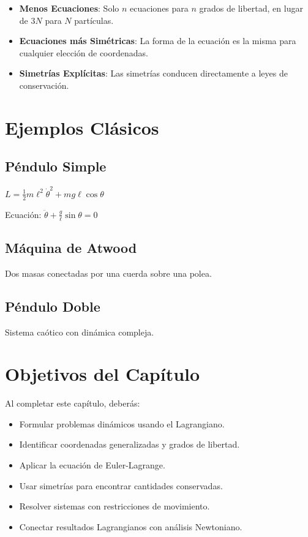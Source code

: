 \begin{itemize}
    \item \textbf{Menos Ecuaciones}: Solo $n$ ecuaciones para $n$ grados de libertad, en lugar de $3N$ para $N$ partículas.
    \item \textbf{Ecuaciones más Simétricas}: La forma de la ecuación es la misma para cualquier elección de coordenadas.
    \item \textbf{Simetrías Explícitas}: Las simetrías conducen directamente a leyes de conservación.
\end{itemize}

\section{Ejemplos Clásicos}

\subsection*{Péndulo Simple}

$L = \frac{1}{2}m\ell^2 \dot{\theta}^2 + mg\ell \cos\theta$

Ecuación: $\ddot{\theta} + \frac{g}{\ell}\sin\theta = 0$

\subsection*{Máquina de Atwood}

Dos masas conectadas por una cuerda sobre una polea.

\subsection*{Péndulo Doble}

Sistema caótico con dinámica compleja.

\section*{Objetivos del Capítulo}

Al completar este capítulo, deberás:
\begin{itemize}
    \item Formular problemas dinámicos usando el Lagrangiano.
    \item Identificar coordenadas generalizadas y grados de libertad.
    \item Aplicar la ecuación de Euler-Lagrange.
    \item Usar simetrías para encontrar cantidades conservadas.
    \item Resolver sistemas con restricciones de movimiento.
    \item Conectar resultados Lagrangianos con análisis Newtoniano.
\end{itemize}

\newpage

